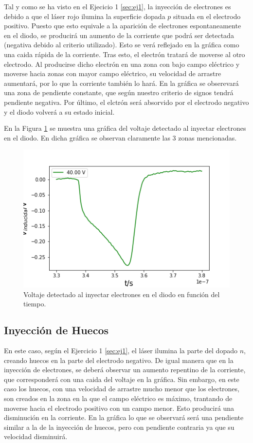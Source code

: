 \documentclass[twoside]{article}
\begin{document}
			Tal y como se ha visto en el Ejecicio 1 \ref{sec:ej1}, la inyección de electrones es debido a que el láser rojo ilumina la superficie dopada $p$ situada en el electrodo positivo. Puesto que esto equivale a la aparición de electrones espontaneamente en el diodo, se producirá un aumento de la corriente que podrá ser detectada (negativa debido al criterio utilizado). Esto se verá reflejado en la gráfica como una caida rápida de la corriente. Tras esto, el electrón tratará de moverse al otro electrodo. Al producirse dicho electrón en una zona con bajo campo eléctrico y moverse hacia zonas con mayor campo eléctrico, su velocidad de arrastre aumentará, por lo que la corriente también lo hará. En la gráfica se obserevará una zona de pendiente constante, que según nuestro criterio de signos tendrá pendiente negativa. Por último, el elctrón será absorvido por el electrodo negativo y el diodo volverá a su estado inicial.

			En la Figura \ref{Img:ejemploE} se muestra una gráfica del voltaje detectado al inyectar electrones en el diodo. En dicha gráfica se observan claramente las 3 zonas mencionadas.

				\begin{figure}[H]
					\centering
					\includegraphics[scale=0.8]{Ejemplo.png}
					\caption{\label{Img:ejemploE}Voltaje detectado al inyectar electrones en el diodo en función del tiempo.}
				\end{figure}

		\subsection{Inyección de Huecos}

			En este caso, según el Ejercicio 1 \ref{sec:ej1}, el láser ilumina la parte del dopado $n$, creando huecos en la parte del electrodo negativo. De igual manera que en la inyección de electrones, se deberá observar un aumento repentino de la corriente, que corresponderá con una caida del voltaje en la gráfica. Sin embargo, en este caso los huecos, con una velocidad de arrastre mucho menor que los electrones, son creados en la zona en la que el campo eléctrico es máximo, trantando de moverse hacia el electrodo positivo con un campo menor. Esto producirá una disminución en la corriente. En la gráfica lo que se observará será una pendiente similar a la de la inyección de huecos, pero con pendiente contraria ya que su velocidad disminuirá.
\end{document}
